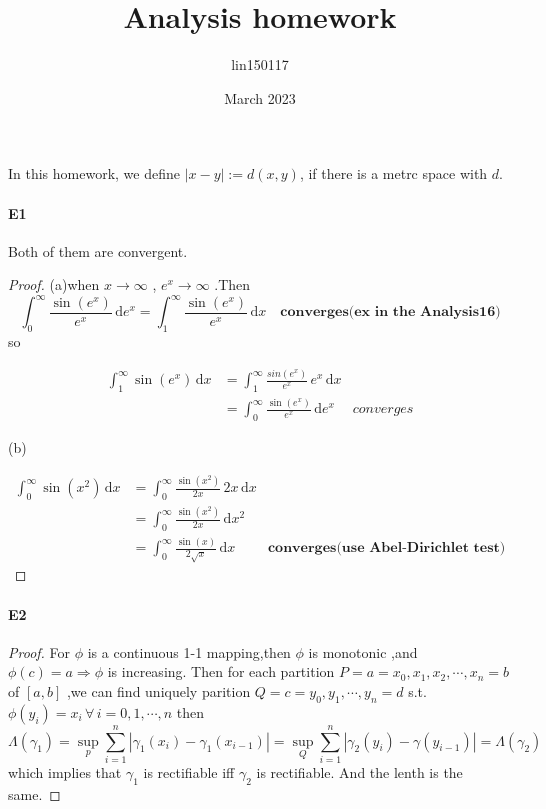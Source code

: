 \documentclass{article}
\title{Analysis homework}
\author{lin150117 }
\date{March 2023}
\begin{document}
In this homework, we define  $ |x-y|:=d(x,y) $, if there is a metrc space with  $ d $.  
\paragraph{E1} Both of them are convergent.

\begin{proof}
    (a)when  $ x\to \infty $ , $ e^x\to \infty $ .Then
    \[\int_{0}^{\infty}  \frac{\sin(e^x)}{e^x}  \, \mathrm{d}e^x=\int_{1}^{\infty}  \frac{\sin(e^x) }{e^x}  \, \mathrm{d}x \quad \textbf{converges(ex in the Analysis16)}   \]
    so 
    
        \begin{align*}
            \int_{1}^{\infty} \sin(e^x)\, \mathrm{d}x &=\int_{1}^{\infty}  \frac{sin(e^x)}{e^x}\,e^x  \, \mathrm{d}x \\
            &=\int_{0}^{\infty}  \frac{\sin(e^x)}{e^x}  \, \mathrm{d}e^x
            &converges
        \end{align*}
        
        
    
    (b)
    
        \begin{align*}
            \int_{0}^{\infty} \sin(x^2)\, \mathrm{d}x &=\int_{0}^{\infty}  \frac{\sin(x^2)}{2x}  \, 2x\, \mathrm{d}x\\
            &=\int_{0}^{\infty} \frac{\sin(x^2)}{2x}\, \mathrm{d}x^2\\  
            &=\int_{0}^{\infty}  \frac{\sin(x)}{2\sqrt{x}} \, \mathrm{d}x
            &\textbf{converges(use  Abel-Dirichlet test)}     
        \end{align*}
    
\end{proof}

\paragraph{E2}
\begin{proof}
    For  $ \phi $ is a continuous 1-1 mapping,then  $ \phi $ is monotonic ,and  $ \phi(c)=a \Rightarrow  \phi $ is increasing.
    Then for each  partition $ P={a=x_0,x_1,x_2,\cdots,x_n=b} $ of  $ [a,b] $ ,we can find uniquely parition  $ Q={c=y_0,y_1,\cdots,y_n=d} $ s.t.  $ \phi(y_i)=x_i\, \forall\,i=0,1,\cdots,n$ 
    then \[\Lambda (\gamma_1)=\sup\limits_{p}\sum\limits_{i=1}^{n }   |\gamma_1(x_i)-\gamma_1(x_{i-1}) |=\sup\limits_{Q}\sum\limits_{i=1}^{n } |\gamma_2(y_i)-\gamma(y_{i-1}) |=\Lambda(\gamma_2) \]
    which implies that  $ \gamma_1 $ is rectifiable iff $ \gamma_2 $ is rectifiable.
    And the lenth is the same.
\end{proof}
\end{document}
